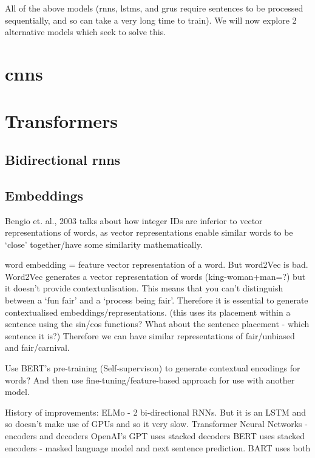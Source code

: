 All of the above models (\acrshort{rnn}s, \acrshort{lstm}s, and \acrshort{gru}s require sentences to be processed sequentially, and so can take a very long time to train). We will now explore 2 alternative models which seek to solve this.

\section{\acrlong{cnn}s}
\label{sec:background_cnns}

\section{Transformers}
\label{sec:background_transformers}

\subsection{Bidirectional \acrshort{rnn}s}
\subsection{Embeddings}
Bengio et. al., 2003 talks about how integer IDs are inferior to vector representations of words, as vector representations enable similar words to be `close' together/have some similarity mathematically.

word embedding = feature vector representation of a word. But word2Vec is bad. Word2Vec generates a vector representation of words (king-woman+man=?) but it doesn't provide contextualisation. This means that you can't distinguish between a `fun fair' and a `process being fair'. Therefore it is essential to generate contextualised embeddings/representations. (this uses its placement within a sentence using the sin/cos functions? What about the sentence placement - which sentence it is?) Therefore we can have similar representations of fair/unbiased and fair/carnival.

Use BERT's pre-training (Self-supervison) to generate contextual encodings for words? And then use fine-tuning/feature-based approach for use with another model.






History of improvements: 
ELMo - 2 bi-directional RNNs. But it is an LSTM and so doesn't make use of GPUs and so it very slow.
Transformer Neural Networks - encoders and decoders
OpenAI's GPT uses stacked decoders
BERT uses stacked encoders - masked language model and next sentence prediction.
BART uses both

